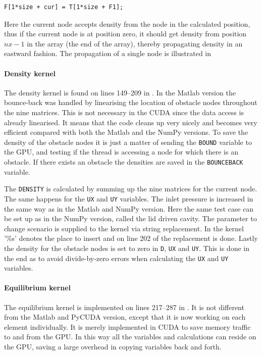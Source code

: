 \begin{verbatim}
F[1*size + cur] = T[1*size + F1];
\end{verbatim}

Here the current node accepts density from the node in the calculated position, thus if the current node is at position zero, it should get density from position $nx-1$ in the array (the end of the array), thereby propagating density in an eastward fashion. The propagation of a single node is illustrated in 


\paragraph{Density kernel}
The density kernel is found on lines 149--209 in . In the Matlab version the bounce-back was handled by linearising the location of obstacle nodes throughout the nine matrices. This is not necessary in the CUDA since the data access is already linearised. It means that the code cleans up very nicely and becomes very efficient compared with both the Matlab and the NumPy versions. To save the density of the obstacle nodes it is just a matter of sending the \texttt{BOUND} variable to the GPU, and testing if the thread is accessing a node for which there is an obstacle. If there exists an obstacle the densities are saved in the \texttt{BOUNCEBACK} variable.

The \texttt{DENSITY} is calculated by summing up the nine matrices for the current node. The same happens for the \texttt{UX} and \texttt{UY} variables. The inlet pressure is increased in the same way as in the Matlab and NumPy version. Here the same test case can be set up as in the NumPy version, called the lid driven cavity. The parameter to change scenario is supplied to the kernel via string replacement. In the kernel '\%s' denotes the place to insert and on line 202 of  the replacement is done. Lastly the density for the obstacle nodes is set to zero in \texttt{D}, \texttt{UX} and \texttt{UY}. This is done in the end as to avoid divide-by-zero errors when calculating the \texttt{UX} and \texttt{UY} variables.


\paragraph{Equilibrium kernel}
The equilibrium kernel is implemented on lines 217--287 in . It is not different from the Matlab and PyCUDA version, except that it is now working on each element individually. It is merely implemented in CUDA to save memory traffic to and from the GPU. In this way all the variables and calculations can reside on the GPU, saving a large overhead in copying variables back and forth.

